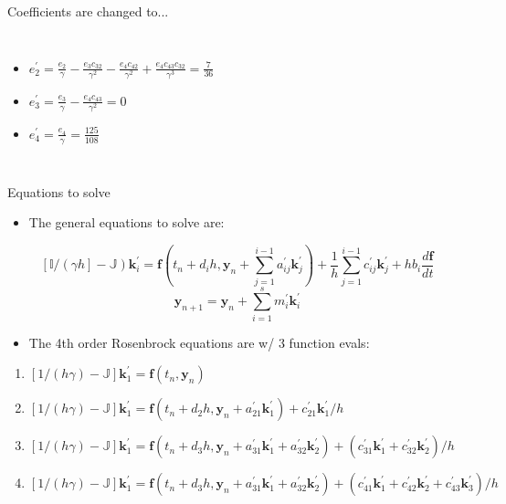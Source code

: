 \documentclass[serif]{beamer}
\begin{document}
\begin{frame}{Coefficients are changed to...}
\begin{footnotesize}
\begin{columns}[T]
\begin{itemize}
    \item $e^\prime_2 = \frac{e_2}{\gamma} - \frac{e_3c_{32}}{\gamma^2} - \frac{e_4c_{42}}{\gamma^2} + \frac{e_4c_{43}c_{32}}{\gamma^3} = \frac{7}{36}$
    \item $e^\prime_3 = \frac{e_3}{\gamma} - \frac{e_4c_{43}}{\gamma^2} = 0$
    \item $e^\prime_4 = \frac{e_4}{\gamma} = \frac{125}{108}$
  \end{itemize}
  \end{columns}
  \end{footnotesize}
\end{frame}

\begin{frame}{Equations to solve}
  \begin{itemize}
    \item  The general equations to solve are:
  \end{itemize}
    \begin{equation}
    \nonumber 
    \left[\mathbb{I}/\left(\gamma h\right] - \mathbb{J}\right)\mathbf{k}^\prime_{i} = \mathbf{f} \left(t_n + d_ih,\mathbf{y}_n + \sum_{j=1}^{i-1}a^\prime_{ij}\mathbf{k}^\prime_{j}\right) 
                   + \frac{1}{h}\sum_{j=1}^{i-1} c^\prime_{ij}\mathbf{k}^\prime_{j}  + hb_i\frac{d\mathbf{f}}{dt}
  \end{equation}
    \begin{equation}
    \nonumber 
    \mathbf{y}_{n+1} = \mathbf{y}_{n} + \sum_{i=1}^s m^\prime_i\mathbf{k}^\prime_i
  \end{equation}
  \begin{itemize}
    \item The 4th order Rosenbrock equations are w/ 3 function evals:
  \end{itemize}
  \begin{enumerate}
    \item \scriptsize $\left[1/\left(h\gamma\right) - \mathbb{J}\right]\mathbf{k}^\prime_1 = \mathbf{f}\left(t_n, \mathbf{y}_n\right)$
    \item $\left[1/\left(h\gamma\right) - \mathbb{J}\right]\mathbf{k}^\prime_1 = \mathbf{f}\left(t_n + d_2h, \mathbf{y}_n + a^\prime_{21}\mathbf{k}^\prime_1\right) + c^\prime_{21}\mathbf{k}^\prime_1/h$
    \item $\left[1/\left(h\gamma\right) - \mathbb{J}\right]\mathbf{k}^\prime_1 = \mathbf{f}\left(t_n + d_3h, \mathbf{y}_n + a^\prime_{31}\mathbf{k}^\prime_1 + a^\prime_{32}\mathbf{k}^\prime_2\right) + \left(c^\prime_{31}\mathbf{k}^\prime_1 + c^\prime_{32}\mathbf{k}^\prime_2\right)/h$
    \item $\left[1/\left(h\gamma\right) - \mathbb{J}\right]\mathbf{k}^\prime_1 = \mathbf{f}\left(t_n + d_3h, \mathbf{y}_n + a^\prime_{31}\mathbf{k}^\prime_1 + a^\prime_{32}\mathbf{k}^\prime_2\right) + \left(c^\prime_{41}\mathbf{k}^\prime_1 + c^\prime_{42}\mathbf{k}^\prime_2 + c^\prime_{43}\mathbf{k}^\prime_3\right)/h$
  \end{enumerate}
\end{frame}
\end{document}
